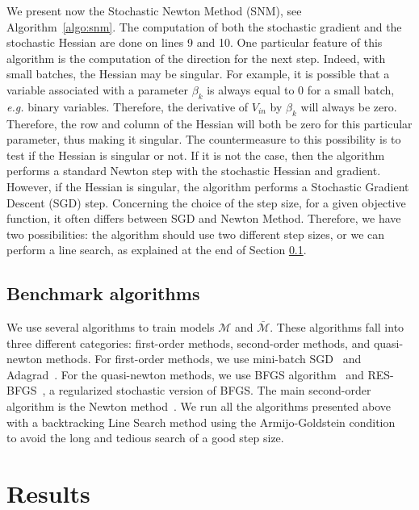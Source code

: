 \documentclass[conference]{IEEEtran}
\begin{document}
We present now the Stochastic Newton Method (SNM), see Algorithm~\ref{algo:snm}. The computation of both the stochastic gradient and the stochastic Hessian are done on lines 9 and 10. One particular feature of this algorithm is the computation of the direction for the next step. Indeed, with small batches, the Hessian may be singular. For example, it is possible that a variable associated with a parameter $\beta_k$ is always equal to 0 for a small batch, {\it e.g.} binary variables. Therefore, the derivative of $V_{in}$ by $\beta_k$ will always be zero. Therefore, the row and column of the Hessian will both be zero for this particular parameter, thus making it singular. The countermeasure to this possibility is to test if the Hessian is singular or not. If it is not the case, then the algorithm performs a standard Newton step with the stochastic Hessian and gradient. However, if the Hessian is singular, the algorithm performs a Stochastic Gradient Descent (SGD) step. Concerning the choice of the step size, for a given objective function, it often differs between SGD and Newton Method. Therefore, we have two possibilities: the algorithm should use two different step sizes, or we can perform a line search, as explained at the end of Section \ref{sec:algorithms}. 

\subsection{Benchmark algorithms}
\label{sec:algorithms}

We use several algorithms to train models $\mathcal{M}$ and $\bar{\mathcal{M}}$. These algorithms fall into three different categories: first-order methods, second-order methods, and quasi-newton methods. For first-order methods, we use mini-batch SGD~\cite{ruder_overview_2016} and Adagrad~\cite{duchi_adaptive_2011}. For the quasi-newton methods, we use BFGS algorithm~\cite{fletcher_practical_1987} and RES-BFGS~\cite{mokhtari_res:_2014}, a regularized stochastic version of BFGS. The main second-order algorithm is the Newton method~\cite{caswell_treatise_1685}. We run all the algorithms presented above with a backtracking Line Search method using the Armijo-Goldstein condition~\cite{armijo_minimization_1966} to avoid the long and tedious search of a good step size.


\section{Results}
\label{sec:res}
\end{document}
